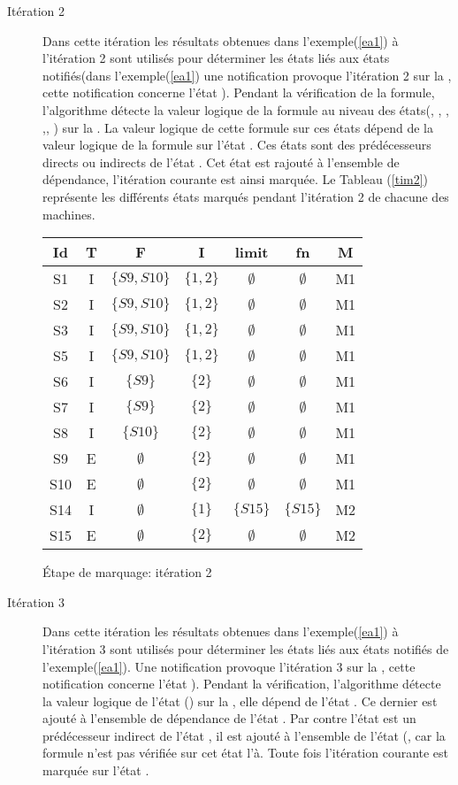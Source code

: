 \begin{Exemple}
\begin{description}
	\item[Itération 2] Dans cette itération les résultats obtenues dans l'exemple(\ref{ea1}) à l'itération 2 sont utilisés pour déterminer les états liés aux états notifiés(dans l'exemple(\ref{ea1}) une notification provoque l'itération 2 sur la \mone{}, cette notification concerne l'état ). Pendant la vérification de la formule, l'algorithme détecte la valeur logique de la formule au niveau des états(, , , ,, ) sur la \mone{}. La valeur logique de cette formule sur ces états dépend de la valeur logique de la formule  sur l'état . Ces états sont des prédécesseurs directs ou indirects de l'état  . Cet état est rajouté à l'ensemble  de dépendance, l'itération courante est ainsi marquée. 
Le Tableau (\ref{tim2}) représente les différents états marqués pendant l'itération 2 de chacune des machines.  
	\begin{tableth}
	\centering
	\begin{tabular}{|*{7}{c|}}
		\hline
		Id&		T&			F&	I&	limit&	fn&		M\\
		\hline
		S1&	I&	$\{S9,S10\}$&	$\{1,2\}$&	$\emptyset$& $\emptyset$&		M1\\ \hline
		S2&	I&	$\{S9,S10\}$&	$\{1,2\}$&	$\emptyset$& $\emptyset$&		M1\\ \hline
		S3&	I&	$\{S9,S10\}$&	$\{1,2\}$&	$\emptyset$& $\emptyset$&		M1\\ \hline
		S5&	I&	$\{S9,S10\}$&	$\{1,2\}$&	$\emptyset$& $\emptyset$&		M1\\ \hline
		S6&	I&	$\{S9\}$	   &	$\{2\}$&	$\emptyset$& $\emptyset$&		M1\\ \hline
		S7&	I&	$\{S9\}$    &	$\{2\}$&	$\emptyset$& $\emptyset$&		M1\\ \hline
		S8&	I&	$\{S10\}$   &	$\{2\}$&	$\emptyset$& $\emptyset$&		M1\\ \hline
		S9&	E&	$\emptyset$&	$\{2\}$&	$\emptyset$& $\emptyset$&		M1\\ \hline
		S10&E&	$\emptyset$&	$\{2\}$&	$\emptyset$& $\emptyset$&		M1\\ \hline
		S14&I&	$\emptyset$&	$\{1\}$&	$\{S15\}$   & $\{S15\}$&			M2\\ \hline
		S15&E&	$\emptyset$&	$\{2\}$&	$\emptyset$& $\emptyset$&		M2\\				
		\hline
	\end{tabular}
	\caption{Étape de marquage: itération 2}\label{tim2}
\end{tableth}
	\item[Itération 3] Dans cette itération les résultats obtenues dans l'exemple(\ref{ea1}) à l'itération 3 sont utilisés pour déterminer les états liés aux états notifiés de l'exemple(\ref{ea1}). Une notification provoque l'itération 3 sur la \mtree{}, cette notification concerne l'état ). Pendant la vérification, l'algorithme détecte la valeur logique de l'état () sur la \mtree{}, elle dépend de l'état . Ce dernier est ajouté à l'ensemble  de dépendance de l'état . Par contre l'état  est un prédécesseur indirect de l'état , il est ajouté à l'ensemble  de l'état (, car la formule n'est pas vérifiée sur cet état l'à. Toute fois l'itération courante est marquée sur l'état . 

\end{description}
\end{Exemple}
